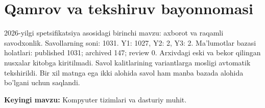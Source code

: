 \documentclass[10pt,a4paper,oneside]{article}
\begin{document}
\section*{Qamrov va tekshiruv bayonnomasi}
2026-yilgi spetsifikatsiya asosidagi birinchi mavzu: axborot va raqamli savodxonlik.
Savollarning soni: 1031. Y1: 1027, Y2: 2, Y3: 2.
Ma'lumotlar bazasi holatlari: published 1031; archived 147; review 0.
Arxivdagi eski va bekor qilingan nusxalar kitobga kiritilmadi.
Savol kalitlarining variantlarga mosligi avtomatik tekshirildi.
Bir xil matnga ega ikki alohida savol ham manba bazada alohida bo'lgani uchun saqlandi.
\par\textbf{Keyingi mavzu:} Kompyuter tizimlari va dasturiy muhit.
\end{document}
